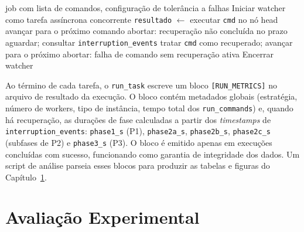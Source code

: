 \begin{algorithm}[htb]
  \caption{Laço do \texttt{run\_task} com tolerância a falhas ativa.}
  \label{alg:run-task}
  \begin{algorithmic}[1]
    \Require job com lista de comandos, configuração de tolerância a falhas
    \State Iniciar watcher como tarefa assíncrona concorrente
      \State \texttt{resultado} $\leftarrow$ executar \texttt{cmd} no nó head
        \State avançar para o próximo comando
            \State abortar: recuperação não concluída no prazo
          \EndIf
          \State aguardar; consultar \texttt{interruption\_events}
        \EndWhile
        \State tratar \texttt{cmd} como recuperado; avançar para o próximo
      \Else
        \State abortar: falha de comando sem recuperação ativa
      \EndIf
    \EndFor
    \State Encerrar watcher
  \end{algorithmic}
\end{algorithm}


Ao término de cada tarefa, o \texttt{run\_task} escreve um bloco
\texttt{[RUN\_METRICS]} no arquivo de resultado da execução. O bloco contém metadados
globais (estratégia, número de workers, tipo de instância, tempo total dos
\texttt{run\_commands}) e, quando há recuperação, as durações de fase calculadas a
partir dos \textit{timestamps} de \texttt{interruption\_events}: \texttt{phase1\_s}
(P1), \texttt{phase2a\_s}, \texttt{phase2b\_s}, \texttt{phase2c\_s} (subfases de P2) e
\texttt{phase3\_s} (P3). O bloco é emitido apenas em execuções concluídas com sucesso,
funcionando como garantia de integridade dos dados. Um script de análise parseia esses
blocos para produzir as tabelas e figuras do Capítulo~\ref{ch:avaliacao}.


\chapter{Avaliação Experimental}
\label{ch:avaliacao}

